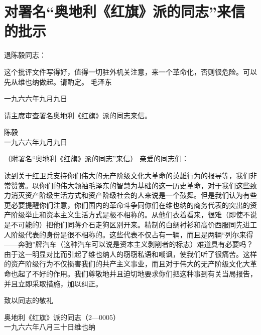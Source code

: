 \section[对署名“奥地利《红旗》派的同志”来信的批示（一九六六年九月九日）]{对署名“奥地利《红旗》派的同志”来信的批示}


退陈毅同志：

这个批评文件写得好，值得一切驻外机关注意，来一个革命化，否则很危险。可以先从维也纳做起。请酌定。
毛泽东
{\raggedleft 一九六六年九月九日\par}

请主席审查署名奥地利《红旗》派的同志来信。

{\raggedleft  陈毅\\一九六六年九月九日\par}

（附署名“奥地利《红旗》派的同志”来信）
亲爱的同志们：

读到关于红卫兵支持你们伟大的无产阶级文化大革命的英雄行为的报导等，我们非常赞赏。以你们的伟大领袖毛泽东的智慧为基础的这一历史革命，对于我们这些致力消灭资产阶级生活方式和资产阶级社会的人来说是一个鼓舞。但是我们认为有些更必要提醒你们注意，你们国内的革命斗争同你们在维也纳的商务代表的突出的资产阶级举止和资本主义生活方式是极不相称的。从他们衣着看来，很难（即使不说是不可能的）把他们同蒋介石走狗区别开来。精制的白绸衬衫和高价西服同先进工人阶级代表的身份是很不相称的。这些代表不仅占有一辆，而且是两辆“列尔来得——奔驰”牌汽车（这种汽车可以说是资本主义剥削者的标志）难道具有必要吗？由于这一明显对比而引起了维也纳人的窃窃私语和嘲讽，使我们听了很痛苦。这样的资产阶级行为不仅损害我们的共产主义事业，而且对于伟大的无产阶级文化大革命也起了不好的作用。我们尊敬地并且迫切地要求你们把这种事到有关当局报告，并且立即采取措施，加以纠正。

致以同志的敬礼

{\raggedleft  奥地利《红旗》派的同志（2—0005）\\ 一九六六年八月三十日维也纳\par}


